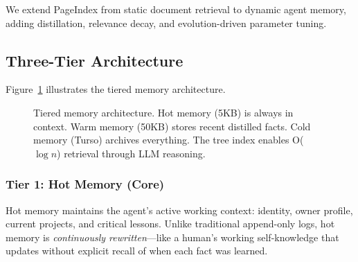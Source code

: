 \documentclass[conference]{IEEEtran}
\begin{document}
We extend PageIndex from static document retrieval to dynamic agent memory, adding distillation, relevance decay, and evolution-driven parameter tuning.

\subsection{Three-Tier Architecture}

Figure~\ref{fig:memory} illustrates the tiered memory architecture.

\begin{figure}[t]
\centering
{}
\caption{Tiered memory architecture. Hot memory (5KB) is always in context. Warm memory (50KB) stores recent distilled facts. Cold memory (Turso) archives everything. The tree index enables O($\log n$) retrieval through LLM reasoning.}
\label{fig:memory}
\end{figure}

\subsubsection{Tier 1: Hot Memory (Core)}

Hot memory maintains the agent's active working context: identity, owner profile, current projects, and critical lessons. Unlike traditional append-only logs, hot memory is \textit{continuously rewritten}—like a human's working self-knowledge that updates without explicit recall of when each fact was learned.
\end{document}
